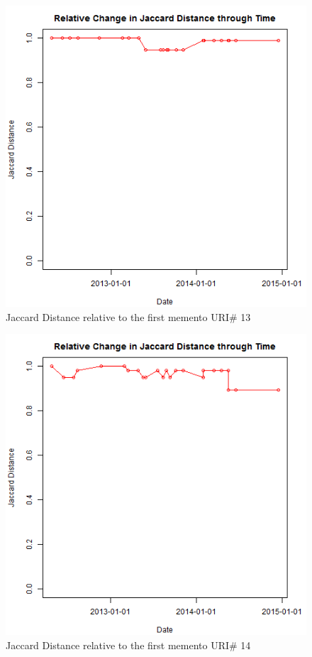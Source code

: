 \begin{figure}[ht]
	\begin{center}
		 \includegraphics[scale=0.60]{url13}
		  \caption{Jaccard Distance relative to the first memento URI\# 13}
	 \end{center}
\end{figure}
\begin{figure}[ht]
	\begin{center}
		 \includegraphics[scale=0.60]{url14}
		  \caption{Jaccard Distance relative to the first memento URI\# 14}
	 \end{center}
\end{figure}

